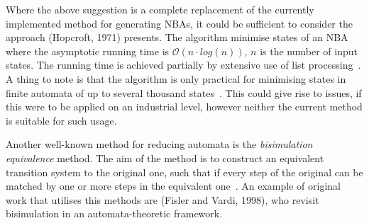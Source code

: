 Where the above suggestion is a complete replacement of the currently implemented method for generating NBAs, it could be sufficient to consider the approach (Hopcroft, 1971)\cite{hopcroft1971n} presents. The algorithm minimise states of an NBA where the asymptotic running time is $\mathcal{O}(n \cdot log(n))$, $n$ is the number of input states. The running time is achieved partially by extensive use of list processing~\cite{hopcroft1971n}. A thing to note is that the algorithm is only practical for minimising states in finite automata of up to several thousand states~\cite{hopcroft1971n}. This could give rise to issues, if this were to be applied on an industrial level, however neither the current method is suitable for such usage.

Another well-known method for reducing automata is the \emph{bisimulation equivalence} method. The aim of the method is to construct an equivalent transition system to the original one, such that if every step of the original can be matched by one or more steps in the equivalent one~\cite{baier2008principles}. An example of original work that utilises this methods are (Fisler and Vardi, 1998)\cite{fisler1998a}, who revisit bisimulation in an automata-theoretic framework.

